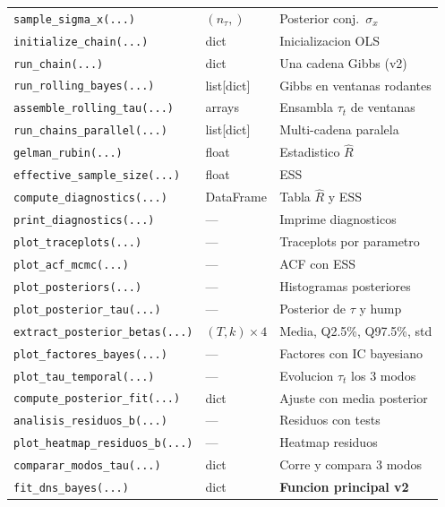 \documentclass[12pt, a4paper]{article}
\theoremstyle{plain}
\theoremstyle{definition}
\theoremstyle{remark}
\begin{document}
\begin{table}[H]
\begin{tabular}{L{4.5cm} L{2.5cm} L{7cm}}
\texttt{sample\_sigma\_x(...)} & $(n_\tau,)$ & Posterior conj.\ $\sigma_x$ \\
\texttt{initialize\_chain(...)} & dict & Inicializacion OLS \\
\texttt{run\_chain(...)} & dict & Una cadena Gibbs (v2) \\
\texttt{run\_rolling\_bayes(...)} & list[dict] & Gibbs en ventanas rodantes \\
\texttt{assemble\_rolling\_tau(...)} & arrays & Ensambla $\tau_t$ de ventanas \\
\texttt{run\_chains\_parallel(...)} & list[dict] & Multi-cadena paralela \\
\texttt{gelman\_rubin(...)} & float & Estadistico $\hat{R}$ \\
\texttt{effective\_sample\_size(...)} & float & ESS \\
\texttt{compute\_diagnostics(...)} & DataFrame & Tabla $\hat{R}$ y ESS \\
\texttt{print\_diagnostics(...)} & --- & Imprime diagnosticos \\
\texttt{plot\_traceplots(...)} & --- & Traceplots por parametro \\
\texttt{plot\_acf\_mcmc(...)} & --- & ACF con ESS \\
\texttt{plot\_posteriors(...)} & --- & Histogramas posteriores \\
\texttt{plot\_posterior\_tau(...)} & --- & Posterior de $\tau$ y hump \\
\texttt{extract\_posterior\_betas(...)} & $(T,k)\times 4$ & Media, Q2.5\%, Q97.5\%, std \\
\texttt{plot\_factores\_bayes(...)} & --- & Factores con IC bayesiano \\
\texttt{plot\_tau\_temporal(...)} & --- & Evolucion $\tau_t$ los 3 modos \\
\texttt{compute\_posterior\_fit(...)} & dict & Ajuste con media posterior \\
\texttt{analisis\_residuos\_b(...)} & --- & Residuos con tests \\
\texttt{plot\_heatmap\_residuos\_b(...)} & --- & Heatmap residuos \\
\texttt{comparar\_modos\_tau(...)} & dict & Corre y compara 3 modos \\
\texttt{fit\_dns\_bayes(...)} & dict & \textbf{Funcion principal v2} \\
\bottomrule
\end{tabular}
\end{table}

\end{document}
